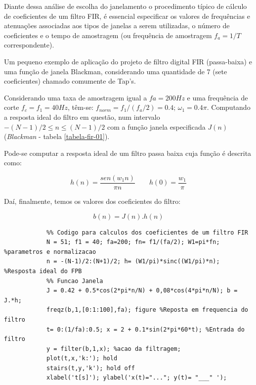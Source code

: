 		Diante dessa análise de escolha do janelamento o procedimento típico de cálculo de coeficientes de um filtro FIR, é essencial especificar os valores de frequências e atenuações associadas aos tipos de janelas a serem utilizadas, o número de coeficientes e o tempo de amostragem (ou frequência de amostragem $ f_a = 1/T $ correspondente).
		
		\begin{exem}
			\label{exemplo-fir-01}
			Um pequeno exemplo de aplicação do projeto de filtro digital FIR (passa-baixa) e uma função de janela Blackman, considerando uma quantidade de 7 (sete coeficientes) chamado comumente de Tap's.
			
			Considerando uma taxa de amostragem igual a $fa= 200 Hz$ e uma frequência de corte $ f_c = f_1 = 40 Hz $, têm-se: $ f_{norm} = f_1/(f_a/2) = 0.4 $; $ \omega_1 = 0.4\pi $. Computando a resposta ideal do filtro em questão, num intervalo $-(N-1)/2 \leq n \leq (N-1)/2$ com a função janela especificada $J(n)$ (\textit{Blackman} - tabela \ref{tabela-fir-01}).
			
			
			Pode-se computar a resposta ideal de um filtro passa baixa cuja função é descrita como:
			
			\begin{equation}
			\label{eq-passa-baixa-fir}
			h(n) = \frac{sen(w_1 n)}{\pi n}
			\qquad
			h(0) = \frac{w_1}{\pi}
			\end{equation}
			
			Daí, finalmente, temos os valores dos coeficientes do filtro:
			
			\[b(n) = J(n).h(n)\]
			
			\begin{lstlisting}
			%% Codigo para calculos dos coeficientes de um filtro FIR
			N = 51; f1 = 40; fa=200; fn= f1/(fa/2); W1=pi*fn; %parametros e normalizacao
			n = -(N-1)/2:(N+1)/2; h= (W1/pi)*sinc((W1/pi)*n); %Resposta ideal do FPB
			%% Funcao Janela
			J = 0.42 + 0.5*cos(2*pi*n/N) + 0,08*cos(4*pi*n/N); b = J.*h;
			freqz(b,1,[0:1:100],fa); figure %Reposta em frequencia do filtro
			t= 0:(1/fa):0.5; x = 2 + 0.1*sin(2*pi*60*t); %Entrada do filtro
			y = filter(b,1,x); %acao da filtragem;
			plot(t,x,'k:'); hold
			stairs(t,y,'k'); hold off
			xlabel('t[s]'); ylabel('x(t)="..."; y(t)= "___" ');
			\end{lstlisting}
			
		\end{exem}
		
